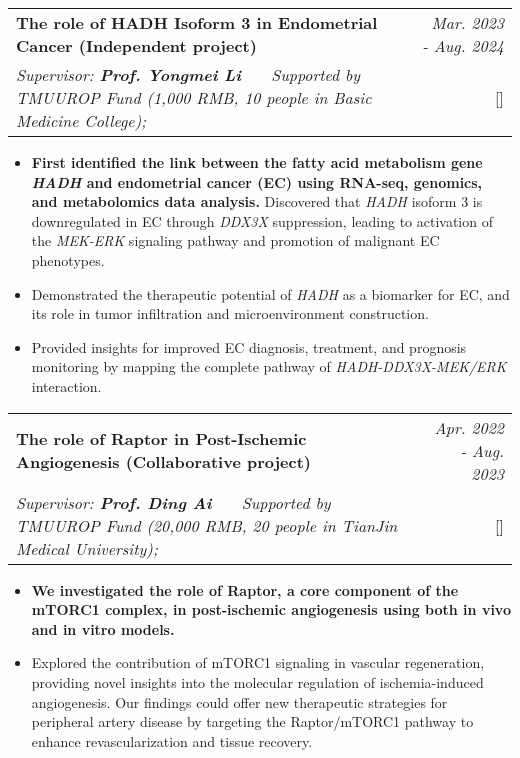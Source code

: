 \documentclass[a4paper,11pt]{article}
\makeatletter
\newcommand{\resumeProject}[4]{
\vspace{0.5mm}\item
    \begin{tabular*}{0.98\textwidth}[t]{l@{\extracolsep{\fill}}r}
        \textbf{#1} & \textit{\footnotesize{#3}} \\
        \footnotesize{\textit{#2}} & \footnotesize{#4}
    \end{tabular*}
    \vspace{-2.4mm}
}
\newcommand{\resumeItemListStart}{\begin{itemize}[leftmargin=*,labelsep=1mm,itemsep=0.5mm]}
\newcommand{\resumeItemListEnd}{\end{itemize}\vspace{-2mm}}
\makeatother
\begin{document}
\begin{justify}
\resumeProject
  {The role of HADH Isoform 3 in Endometrial Cancer \small{(Independent project)}}
  {Supervisor: \textbf{Prof. Yongmei Li} \ \ \ Supported by TMUUROP Fund (1,000 RMB, 10 people in Basic Medicine College);}
  {Mar. 2023 - Aug. 2024}
  {{}[\href{https://github.com/wunaiwuhuang/materials/tree/main/Award\_and\_honour\%E8\%8E\%B7\%E5\%A5\%96\%E8\%AF\%81\%E6\%98\%8E/innovation\%20and\%20Entrepreneurship\%20Competition}{\textcolor{darkblue}{\faGithub}}]}
\resumeItemListStart
  \item \textbf{First identified the link between the fatty acid metabolism gene \textit{HADH} and endometrial cancer (EC) using RNA-seq, genomics, and metabolomics data analysis.} Discovered that \textit{HADH} isoform 3 is downregulated in EC through \textit{DDX3X} suppression, leading to activation of the \textit{MEK-ERK} signaling pathway and promotion of malignant EC phenotypes.
  \item Demonstrated the therapeutic potential of \textit{HADH} as a biomarker for EC, and its role in tumor infiltration and microenvironment construction.
  \item Provided insights for improved EC diagnosis, treatment, and prognosis monitoring by mapping the complete pathway of \textit{HADH-DDX3X-MEK/ERK} interaction.
\resumeItemListEnd

\resumeProject
  {The role of Raptor in Post-Ischemic Angiogenesis \small{(Collaborative project)}}
  {Supervisor: \textbf{Prof. Ding Ai} \ \ \ Supported by TMUUROP Fund (20,000 RMB, 20 people in TianJin Medical University);}
  {Apr. 2022 - Aug. 2023}
  {{}[\href{https://github.com/wunaiwuhuang/materials/tree/main/Award\_and\_honour\%E8\%8E\%B7\%E5\%A5\%96\%E8\%AF\%81\%E6\%98\%8E/innovation\%20and\%20Entrepreneurship\%20Competition}{\textcolor{darkblue}{\faGithub}}]}
\resumeItemListStart
  \item \textbf{We investigated the role of Raptor, a core component of the mTORC1 complex, in post-ischemic angiogenesis using both in vivo and in vitro models.}
  \item Explored the contribution of mTORC1 signaling in vascular regeneration, providing novel insights into the molecular regulation of ischemia-induced angiogenesis. Our findings could offer new therapeutic strategies for peripheral artery disease by targeting the Raptor/mTORC1 pathway to enhance revascularization and tissue recovery.
\resumeItemListEnd


\end{justify}
\end{document}
